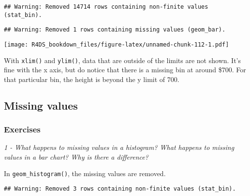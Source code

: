\documentclass[]{article}
\newenvironment{Shaded}{\begin{snugshade}}{\end{snugshade}}
\newcommand{\KeywordTok}[1]{\textcolor[rgb]{0.13,0.29,0.53}{\textbf{#1}}}
\newcommand{\DataTypeTok}[1]{\textcolor[rgb]{0.13,0.29,0.53}{#1}}
\newcommand{\DecValTok}[1]{\textcolor[rgb]{0.00,0.00,0.81}{#1}}
\newcommand{\StringTok}[1]{\textcolor[rgb]{0.31,0.60,0.02}{#1}}
\newcommand{\OtherTok}[1]{\textcolor[rgb]{0.56,0.35,0.01}{#1}}
\newcommand{\OperatorTok}[1]{\textcolor[rgb]{0.81,0.36,0.00}{\textbf{#1}}}
\newcommand{\NormalTok}[1]{#1}
\theoremstyle{definition}
\theoremstyle{definition}
\theoremstyle{definition}
\theoremstyle{remark}
\begin{document}
\begin{verbatim}
## Warning: Removed 14714 rows containing non-finite values (stat_bin).
\end{verbatim}

\begin{verbatim}
## Warning: Removed 1 rows containing missing values (geom_bar).
\end{verbatim}

\texttt{[image: R4DS\_bookdown\_files/figure-latex/unnamed-chunk-112-1.pdf]}

With \texttt{xlim()} and \texttt{ylim()}, data that are outside of the
limits are not shown. It's fine with the x axis, but do notice that
there is a missing bin at around \$700. For that particular bin, the
height is beyond the y limit of 700.

\subsection{Missing values}\label{missing-values}

\subsubsection{Exercises}\label{exercises-14}

\emph{1 - What happens to missing values in a histogram? What happens to
missing values in a bar chart? Why is there a difference?}

In \texttt{geom\_histogram()}, the missing values are removed.

\begin{Shaded}
\end{Shaded}

\begin{verbatim}
## Warning: Removed 3 rows containing non-finite values (stat_bin).
\end{verbatim}
\end{document}
